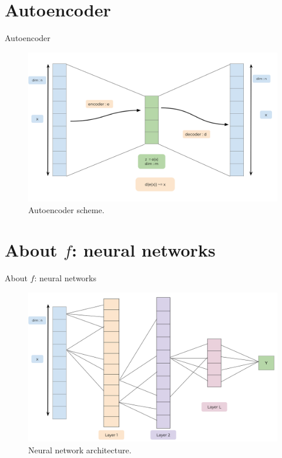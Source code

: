 \documentclass[
  12pt,
  ignorenonframetext,
  compress]{beamer}
\begin{document}
\begin{frame}
\end{frame}

\hypertarget{autoencoder}{%
\section{Autoencoder}\label{autoencoder}}

\begin{frame}{Autoencoder}
\begin{figure}

{\centering \includegraphics[width=0.9\linewidth]{images/Autoencoder} 

}

\caption{Autoencoder scheme.}\label{fig:unnamed-chunk-2}
\end{figure}
\end{frame}

\begin{frame}
\end{frame}

\hypertarget{about-f-neural-networks}{%
\section{\texorpdfstring{About \(f\): neural
networks}{About f: neural networks}}\label{about-f-neural-networks}}

\begin{frame}{About \(f\): neural networks}
\begin{figure}

{\centering \includegraphics[width=0.9\linewidth]{images/NeuralNetwork} 

}

\caption{Neural network architecture.}\label{fig:unnamed-chunk-3}
\end{figure}
\end{frame}
\end{document}
